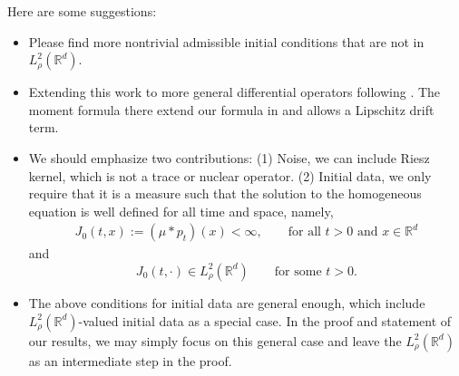 \documentclass[a4paper,11pt]{article}%
\numberwithin{equation}{section}
\theoremstyle{plain}
\theoremstyle{definition}
\newcommand{\R}{\mathbb{R}}
\begin{document}
\bigskip
{ \color{magenta}
Here are some suggestions:
\begin{itemize}
	\item Please find more nontrivial admissible initial conditions that are not in $L_\rho^2(\R^d)$.
	\item Extending this work to more general differential operators following \cite{Huang17}. The
		moment formula there extend our formula in \cite{CK15SHE} and allows a Lipschitz drift term.
	\item We should emphasize two contributions: (1) Noise, we can include Riesz kernel, which is not
		a trace or nuclear operator. (2) Initial data, we only require that it is a measure such that
		the solution to the homogeneous equation is well defined for all time and space, namely,
		\begin{align*}
			J_0(t,x):=(\mu * p_t)(x)<\infty, \qquad \text{for all $t>0$ and  $x\in\R^d$}
		\end{align*}
		and
		\begin{equation*}
			J_0(t,\cdot)	\in L_\rho^2(\R^d) \qquad \text{for some $t>0$.}
		\end{equation*}
	\item The above conditions for initial data are general enough, which include
		$L_\rho^2(\R^d)$-valued initial data as a special case. In the proof and statement of our
		results, we may simply focus on this general case and leave the $L_\rho^2(\R^d)$ as an
		intermediate step in the proof.
\end{itemize}
}
\end{document}
